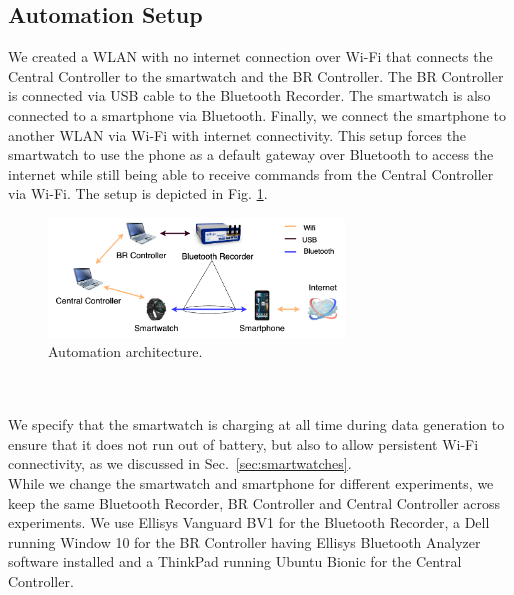 \subsection{Automation Setup} We created a WLAN with no internet connection over Wi-Fi that connects the Central Controller to the smartwatch and the BR Controller. The BR Controller is connected via USB cable to the Bluetooth Recorder. The smartwatch is also connected to a smartphone via Bluetooth. Finally, we connect the smartphone to another WLAN via Wi-Fi with internet connectivity. This setup forces the smartwatch to use the phone as a default gateway over Bluetooth to access the internet while still being able to receive commands from the Central Controller via Wi-Fi. The setup is depicted in Fig. \ref{fig:automation_testbed}. 


\begin{figure}[H]
 \centering
 \includegraphics[width=0.7\textwidth]{figures/automation_testbed.png}
 \caption{Automation architecture.}
 \label{fig:automation_testbed}
\end{figure}

\\
\\

We specify that the smartwatch is charging at all time during data generation to ensure that it does not run out of battery, but also to allow persistent Wi-Fi connectivity, as we discussed in Sec.~\ref{sec:smartwatches}.
\\

While we change the smartwatch and smartphone for different experiments, we keep the same Bluetooth Recorder, BR Controller and Central Controller across experiments. We use Ellisys Vanguard BV1 for the Bluetooth Recorder, a Dell running Window 10 for the BR Controller having Ellisys Bluetooth Analyzer software installed and a ThinkPad running Ubuntu Bionic for the Central Controller.



